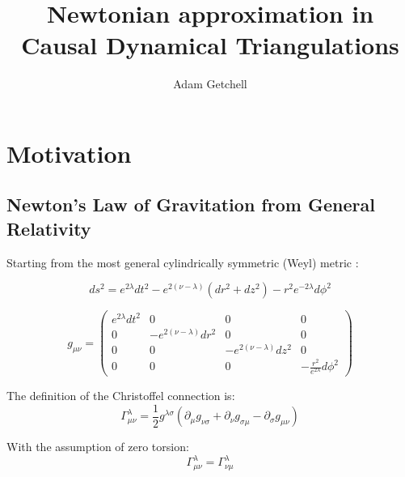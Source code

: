 \documentclass{article}
\title{Newtonian approximation in Causal Dynamical Triangulations}
\author{Adam Getchell}
\date{}
\begin{document}
\maketitle
\tableofcontents

\section{Motivation}

\subsection{Newton's Law of Gravitation from General Relativity}

Starting from the most general cylindrically symmetric (Weyl) metric \cite{synge_relativity}:

\begin{equation}
ds^{2}=e^{2\lambda}dt^{2}-e^{2\left(\nu-\lambda\right)}\left(dr^{2}+dz^{2}\right)-r^{2}e^{-2\lambda}d\phi^{2}
\end{equation}

\begin{equation}
g_{\mu\nu}=\left(\begin{array}{cccc}
e^{2\lambda}dt^{2} & 0 & 0 & 0\\
0 & -e^{2\left(\nu-\lambda\right)}dr^{2} & 0 & 0\\
0 & 0 & -e^{2\left(\nu-\lambda\right)}dz^{2} & 0\\
0 & 0 & 0 & -\frac{r^{2}}{e^{2\lambda}}d\phi^{2}
\end{array}\right)\label{eq:general-axisymmetric-static-matrix-metric}
\end{equation}

The definition of the Christoffel connection is: \cite{carroll2003spacetime} 
\begin{equation}
\Gamma_{\mu\nu}^{\lambda}=\frac{1}{2}g^{\lambda\sigma}\left(\partial_{\mu}g_{\nu\sigma}+\partial_{\nu}g_{\sigma\mu}-\partial_{\sigma}g_{\mu\nu}\right)
\end{equation}

With the assumption of zero torsion:
\begin{equation}
\Gamma_{\mu\nu}^{\lambda}=\Gamma_{\nu\mu}^{\lambda}
\end{equation}
\end{document}
